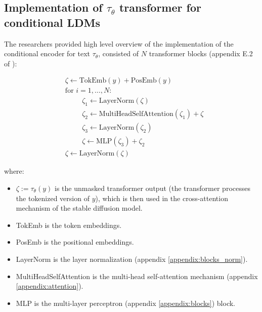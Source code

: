 \subsection{Implementation of $\tau_\theta$ transformer for conditional LDMs}

The researchers provided high level overview of the implementation of the conditional encoder for text $\tau_\theta$, consisted of $N$ transformer blocks (appendix E.2 of \cite{stable_diffusion}):

\begin{align*}
    &\zeta \leftarrow \text{TokEmb}(y) + \text{PosEmb}(y) \\
    &\text{for } i = 1, \ldots, N : \\
        &\hspace{1cm} \zeta_1 \leftarrow \text{LayerNorm}(\zeta) \\
        &\hspace{1cm} \zeta_2 \leftarrow \text{MultiHeadSelfAttention}(\zeta_1) + \zeta \\
        &\hspace{1cm} \zeta_3 \leftarrow \text{LayerNorm}(\zeta_2) \\
        &\hspace{1cm} \zeta \leftarrow \text{MLP}(\zeta_3) + \zeta_2 \\
    &\zeta \leftarrow \text{LayerNorm}(\zeta)
\end{align*}

where:

\begin{itemize}
    \item $\zeta := \tau_\theta(y)$ is the unmasked transformer output (the transformer processes the tokenized version of $y$), which is then used in the cross-attention mechanism of the stable diffusion model.
    \item TokEmb is the token embeddings.
    \item PosEmb is the positional embeddings.
    \item LayerNorm is the layer normalization (appendix \ref{appendix:blocks_norm}).
    \item MultiHeadSelfAttention is the multi-head self-attention mechanism (appendix \ref{appendix:attention}).
    \item MLP is the multi-layer perceptron (appendix \ref{appendix:blocks}) block.
\end{itemize}



